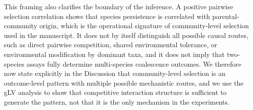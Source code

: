 This framing also clarifies the boundary of the inference. A positive pairwise selection correlation shows that species persistence is correlated with parental-community origin, which is the operational signature of community-level selection used in the manuscript. It does not by itself distinguish all possible causal routes, such as direct pairwise competition, shared environmental tolerance, or environmental modification by dominant taxa, and it does not imply that two-species assays fully determine multi-species coalescence outcomes. We therefore now state explicitly in the Discussion that community-level selection is an outcome-level pattern with multiple possible mechanistic routes, and we use the gLV analysis to show that competitive interaction structure is sufficient to generate the pattern, not that it is the only mechanism in the experiments.

